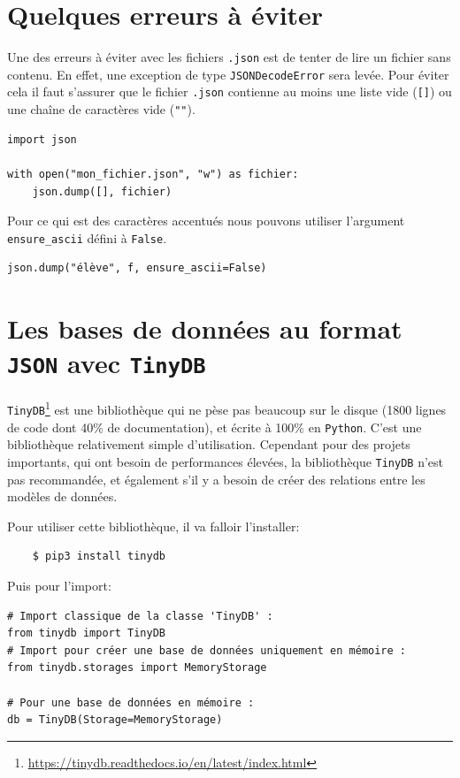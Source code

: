 \documentclass[a4paper,12pt]{book}
\begin{document}
\section{Quelques erreurs à éviter}
Une des erreurs à éviter avec les fichiers \texttt{.json} est de tenter de lire un fichier sans contenu. En effet, une exception de type \texttt{JSONDecodeError} sera levée. Pour éviter cela il faut s'assurer que le fichier \texttt{.json} contienne au moins une liste vide (\texttt{[]}) ou une chaîne de caractères vide (\texttt{""}).
\begin{lstlisting}[caption=Créer un fichier \texttt{.json} contenant une liste vide.]
import json

with open("mon_fichier.json", "w") as fichier:
    json.dump([], fichier)
\end{lstlisting}
\medskip

Pour ce qui est des caractères accentués nous pouvons utiliser l'argument \texttt{ensure\_ascii} défini à \texttt{False}.
\begin{lstlisting}[caption=L'argument \texttt{ensure\_ascii}.]
json.dump("élève", f, ensure_ascii=False)
\end{lstlisting}
\medskip

\section{Les bases de données au format \texttt{JSON} avec \texttt{TinyDB}}
\texttt{TinyDB}\footnote{\url{https://tinydb.readthedocs.io/en/latest/index.html}} est une bibliothèque qui ne pèse pas beaucoup sur le disque (1800 lignes de code dont 40\% de documentation), et écrite à 100\% en \texttt{Python}. C'est une bibliothèque relativement simple d'utilisation. Cependant pour des projets importants, qui ont besoin de performances élevées, la bibliothèque \texttt{TinyDB} n'est pas recommandée, et également s'il y a besoin de créer des relations entre les modèles de données.
\medskip

Pour utiliser cette bibliothèque, il va falloir l'installer:
\begin{verbatim}
    $ pip3 install tinydb
\end{verbatim}
\medskip

Puis pour l'import:
\begin{lstlisting}[caption=Import de \texttt{TinyDB}]
# Import classique de la classe 'TinyDB' :
from tinydb import TinyDB
# Import pour créer une base de données uniquement en mémoire :
from tinydb.storages import MemoryStorage

# Pour une base de données en mémoire :
db = TinyDB(Storage=MemoryStorage)
\end{lstlisting}
\medskip
\end{document}
